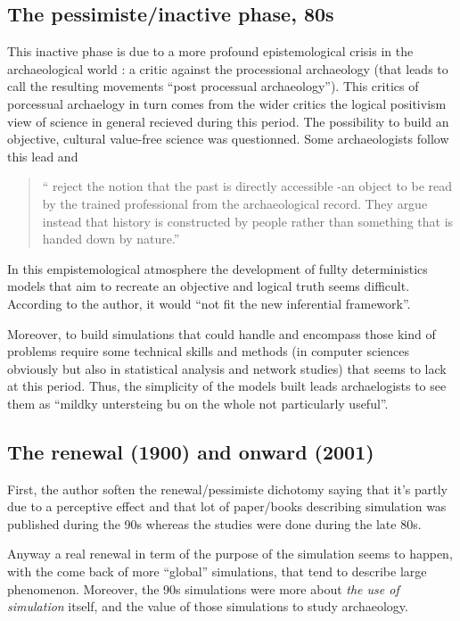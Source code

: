 \documentclass[a4paper]{article}
\begin{document}
\subsection{The pessimiste/inactive phase, 80s}
This inactive phase is due to a more profound epistemological crisis in the archaeological world : a critic against the processional archaeology (that leads to call the resulting movements ``post processual archaeology''). This critics of porcessual archaelogy in turn comes from the wider critics the logical positivism view of science in general recieved during this period. The possibility to build an objective, cultural value-free science was questionned. 
Some archaeologists follow this lead and
\begin{quote}
	``
	 reject the notion that the past is directly accessible -an object to be read by the trained professional from the archaeological record. They argue instead that history is constructed by people rather than something that is handed down by nature.''
	 \\\cite[p.~562]{patterson1989historyandthepostprocessualarchaeologies}
\end{quote}

In this empistemological atmosphere the development of fullty deterministics models that aim to recreate an objective and logical truth seems difficult. According to the author, it would ``not fit the new inferential framework''\citep{lake2014trendsinarchaeologicalsimulation}.

Moreover, to build simulations that could handle and encompass those kind of problems require some technical skills and methods (in computer sciences obviously but also in statistical analysis and network studies) that seems to lack at this period. Thus, the simplicity of the models built leads archaelogists to see them as ``mildky untersteing bu on the whole not particularly useful''\citep{aldenderfer1981computersimulationforarchaeologyanintroductoryessay}.

\subsection{The renewal (1900) and onward (2001)}
First, the author soften the renewal/pessimiste dichotomy saying that it's partly due to a perceptive effect and that lot of paper/books describing simulation was published during the 90s whereas the studies were done during the late 80s.

Anyway a real renewal in term of the purpose of the simulation seems to happen, with the come back of more ``global'' simulations, that tend to describe large phenomenon. Moreover, the 90s simulations were more about \emph{the use of simulation} itself, and the value of those simulations to study archaeology. 
\end{document}
